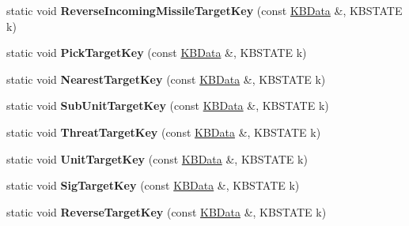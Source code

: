 \begin{DoxyCompactItemize}
\item 
static void {\bfseries Reverse\+Incoming\+Missile\+Target\+Key} (const \hyperlink{classKBData}{K\+B\+Data} \&, K\+B\+S\+T\+A\+TE k)\hypertarget{classFireKeyboard_a09dc27ac1715b40354b4d75876f7bd15}{}\label{classFireKeyboard_a09dc27ac1715b40354b4d75876f7bd15}

\item 
static void {\bfseries Pick\+Target\+Key} (const \hyperlink{classKBData}{K\+B\+Data} \&, K\+B\+S\+T\+A\+TE k)\hypertarget{classFireKeyboard_a5eb47d738199a56e9f429ff63d5fb535}{}\label{classFireKeyboard_a5eb47d738199a56e9f429ff63d5fb535}

\item 
static void {\bfseries Nearest\+Target\+Key} (const \hyperlink{classKBData}{K\+B\+Data} \&, K\+B\+S\+T\+A\+TE k)\hypertarget{classFireKeyboard_a3999d2a693ddc67a62748789adb175ba}{}\label{classFireKeyboard_a3999d2a693ddc67a62748789adb175ba}

\item 
static void {\bfseries Sub\+Unit\+Target\+Key} (const \hyperlink{classKBData}{K\+B\+Data} \&, K\+B\+S\+T\+A\+TE k)\hypertarget{classFireKeyboard_afb13505c8f4cae1f80c3c92c7b10e4db}{}\label{classFireKeyboard_afb13505c8f4cae1f80c3c92c7b10e4db}

\item 
static void {\bfseries Threat\+Target\+Key} (const \hyperlink{classKBData}{K\+B\+Data} \&, K\+B\+S\+T\+A\+TE k)\hypertarget{classFireKeyboard_a99008d15472f4ae7305d22e91bf5c963}{}\label{classFireKeyboard_a99008d15472f4ae7305d22e91bf5c963}

\item 
static void {\bfseries Unit\+Target\+Key} (const \hyperlink{classKBData}{K\+B\+Data} \&, K\+B\+S\+T\+A\+TE k)\hypertarget{classFireKeyboard_aa4c8af462c5939fe81656becda7d26ff}{}\label{classFireKeyboard_aa4c8af462c5939fe81656becda7d26ff}

\item 
static void {\bfseries Sig\+Target\+Key} (const \hyperlink{classKBData}{K\+B\+Data} \&, K\+B\+S\+T\+A\+TE k)\hypertarget{classFireKeyboard_a4338e19389c58acfa8e08004197dc0dd}{}\label{classFireKeyboard_a4338e19389c58acfa8e08004197dc0dd}

\item 
static void {\bfseries Reverse\+Target\+Key} (const \hyperlink{classKBData}{K\+B\+Data} \&, K\+B\+S\+T\+A\+TE k)\hypertarget{classFireKeyboard_a0b30a30ff50fefc0c4d31be2c0d92bb7}{}\label{classFireKeyboard_a0b30a30ff50fefc0c4d31be2c0d92bb7}


\end{DoxyCompactItemize}
